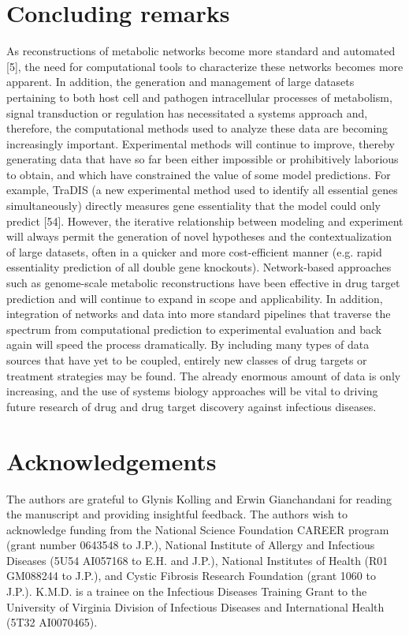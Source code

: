 \section{Concluding remarks}
As reconstructions of metabolic networks become more standard 
and automated [5], the need for computational tools to characterize 
these networks becomes more apparent. In addition, the generation 
and management of large datasets pertaining to both host cell 
and pathogen intracellular processes of metabolism, signal 
transduction or regulation has necessitated a systems approach 
and, therefore, the computational methods used to analyze 
these data are becoming increasingly important. 
Experimental methods will continue to improve, thereby 
generating data that have so far been either impossible 
or prohibitively laborious to obtain, and which have 
constrained the value of some model predictions. For 
example, TraDIS (a new experimental method used to 
identify all essential genes simultaneously) directly 
measures gene essentiality that the model could only 
predict [54]. However, the iterative relationship between 
modeling and experiment will always permit the generation 
of novel hypotheses and the contextualization of large 
datasets, often in a quicker and more cost-efficient 
manner (e.g. rapid essentiality prediction of all double 
gene knockouts). Network-based approaches such as 
genome-scale metabolic reconstructions have been effective 
in drug target prediction and will continue to expand 
in scope and applicability. In addition, integration 
of networks and data into more standard pipelines that 
traverse the spectrum from computational prediction to 
experimental evaluation and back again will speed the 
process dramatically. By including many types of data 
sources that have yet to be coupled, entirely new classes 
of drug targets or treatment strategies may be found. The 
already enormous amount of data is only increasing, and the 
use of systems biology approaches will be vital to driving 
future research of drug and drug target discovery against 
infectious diseases.

\section{Acknowledgements}
The authors are grateful to Glynis Kolling and Erwin 
Gianchandani for reading the manuscript and providing 
insightful feedback. The authors wish to acknowledge 
funding from the National Science Foundation CAREER program 
(grant number 0643548 to J.P.), National Institute of 
Allergy and Infectious Diseases (5U54 AI057168 to E.H. and J.P.), 
National Institutes of Health (R01 GM088244 to J.P.), and 
Cystic Fibrosis Research Foundation (grant 1060 to J.P.). 
K.M.D. is a trainee on the Infectious Diseases Training 
Grant to the University of Virginia Division of Infectious 
Diseases and International Health (5T32 AI0070465).

